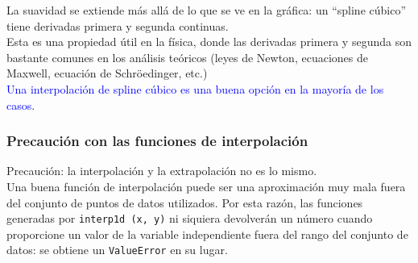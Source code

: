 \begin{frame}
La suavidad se extiende más allá de lo que se ve en la gráfica: un ``spline cúbico'' tiene derivadas primera y segunda continuas.
\\
\bigskip
Esta es una propiedad útil en la física, donde las derivadas primera y segunda son bastante comunes en los análisis teóricos (leyes de Newton, ecuaciones de Maxwell, ecuación de Schröedinger, etc.)
\\
\medskip
\pause
\textcolor{blue}{Una interpolación de spline cúbico es una buena opción en la mayoría de los casos}.
\end{frame}
\begin{frame}
\frametitle{Precaución con las funciones de interpolación}
Precaución: la interpolación y la extrapolación no es lo mismo.
\\
\bigskip
Una buena función de interpolación puede ser una aproximación muy mala fuera del conjunto de puntos de datos utilizados. Por esta razón, las funciones generadas por \texttt{interp1d (x, y)} ni siquiera devolverán un número cuando proporcione un valor de la variable independiente fuera del rango del conjunto de datos: se obtiene un \texttt{ValueError} en su lugar.
\end{frame}
